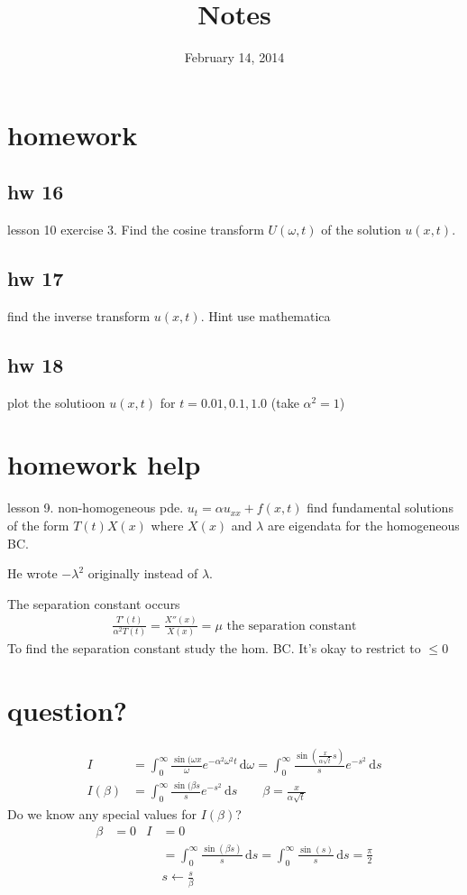 \documentclass{article}
\begin{document}
\title{Notes}
\date{February 14, 2014}
\maketitle
\section*{homework}
\subsection*{hw 16}
lesson 10 exercise 3. Find the cosine transform $U(\omega ,t)$ of the solution $u(x,t)$.
\subsection*{hw 17}
find the inverse transform $u(x,t)$. Hint use mathematica
\subsection*{hw 18}
plot the solutioon $u(x,t)$ for $t=0.01,0.1,1.0$ (take $\alpha ^2=1$)
\section*{homework help}
lesson 9. non-homogeneous pde. $u_t=\alpha u_{xx}+f(x,t)$ find fundamental solutions of the form $T(t)X(x)$ where $X(x)$ and $\lambda $ are eigendata for the homogeneous BC.

He wrote $-\lambda ^2$ originally instead of $\lambda $.

The separation constant occurs
\begin{align*}
  \frac{T'(t)}{\alpha ^2T(t)}=\frac{X''(x)}{X(x)}=\mu \text{ the separation constant}
\end{align*}
To find the separation constant study the hom. BC. It's okay to restrict to $\leq 0$

\section*{question?}
\begin{align*}
  I&=\int_0^\infty{\frac{\sin(\omega x}{\omega }e^{-\alpha ^2\omega ^2t}\,\mathrm{d}\omega }=\int_0^\infty{\frac{\sin(\frac{x}{\alpha \sqrt{t}}s)}{s}e^{-s^2}\,\mathrm{d}s}\\
  I(\beta)&=\int_0^\infty{\frac{\sin(\beta s}{s}e^{-s^2}\,\mathrm{d}s}\qquad\beta =\frac{x}{\alpha \sqrt{t}}
\end{align*}
Do we know any special values for $I(\beta)$?
\begin{align*}
  \beta &=0&I&=0\\
  &&&=\int_0^\infty{\frac{\sin(\beta s)}{s}\,\mathrm{d}s}=\int_0^\infty{\frac{\sin(s)}{s}\,\mathrm{d}s}=\frac{\pi }{2}\\
  &&&s\gets\frac{s}{\beta  }
\end{align*}
\end{document}
